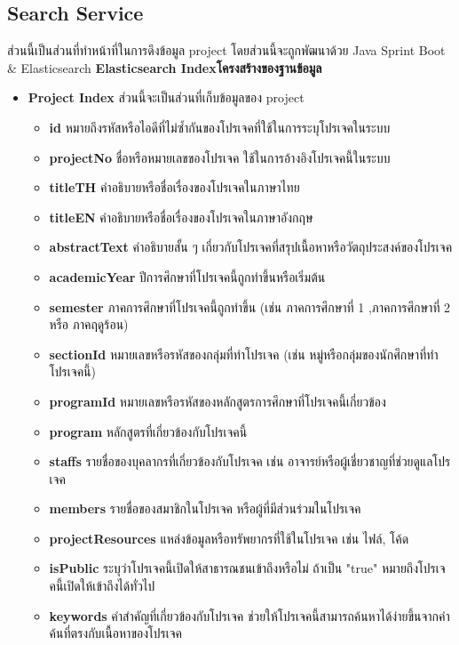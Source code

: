 \subsection{Search Service}
\hspace{1.27cm} \raggedright ส่วนนี้เป็นส่วนที่ทำหน้าที่ในการดึงข้อมูล project โดยส่วนนี้จะถูกพัฒนาด้วย Java Sprint Boot \& Elasticsearch
\textbf{\ifenglish Elasticsearch Index\else โครงสร้างของฐานข้อมูล\fi}
\begin{itemize}
  \item \textbf{Project Index} ส่วนนี้จะเป็นส่วนที่เก็บข้อมูลของ project
  \begin{itemize}
    \item \textbf{id} หมายถึงรหัสหรือไอดีที่ไม่ซ้ำกันของโปรเจคที่ใช้ในการระบุโปรเจคในระบบ
    \item \textbf{projectNo} ชื่อหรือหมายเลขของโปรเจค ใช้ในการอ้างอิงโปรเจคนี้ในระบบ
    \item \textbf{titleTH} คำอธิบายหรือชื่อเรื่องของโปรเจคในภาษาไทย
    \item \textbf{titleEN} คำอธิบายหรือชื่อเรื่องของโปรเจคในภาษาอังกฤษ
    \item \textbf{abstractText} คำอธิบายสั้น ๆ เกี่ยวกับโปรเจคที่สรุปเนื้อหาหรือวัตถุประสงค์ของโปรเจค
    \item \textbf{academicYear} ปีการศึกษาที่โปรเจคนี้ถูกทำขึ้นหรือเริ่มต้น
    \item \textbf{semester} ภาคการศึกษาที่โปรเจคนี้ถูกทำขึ้น (เช่น ภาคการศึกษาที่ 1 ,ภาคการศึกษาที่ 2 หรือ ภาคฤดูร้อน)
    \item \textbf{sectionId} หมายเลขหรือรหัสของกลุ่มที่ทำโปรเจค (เช่น หมู่หรือกลุ่มของนักศึกษาที่ทำโปรเจคนี้)
    \item \textbf{programId} หมายเลขหรือรหัสของหลักสูตรการศึกษาที่โปรเจคนี้เกี่ยวข้อง
    \item \textbf{program} หลักสูตรที่เกี่ยวข้องกับโปรเจคนี้
    \item \textbf{staffs} รายชื่อของบุคลากรที่เกี่ยวข้องกับโปรเจค เช่น อาจารย์หรือผู้เชี่ยวชาญที่ช่วยดูแลโปรเจค
    \item \textbf{members} รายชื่อของสมาชิกในโปรเจค หรือผู้ที่มีส่วนร่วมในโปรเจค
    \item \textbf{projectResources} แหล่งข้อมูลหรือทรัพยากรที่ใช้ในโปรเจค เช่น ไฟล์, โค้ด
    \item \textbf{isPublic} ระบุว่าโปรเจคนี้เปิดให้สาธารณชนเข้าถึงหรือไม่ ถ้าเป็น "true" หมายถึงโปรเจคนี้เปิดให้เข้าถึงได้ทั่วไป
    \item \textbf{keywords} คำสำคัญที่เกี่ยวข้องกับโปรเจค ช่วยให้โปรเจคนี้สามารถค้นหาได้ง่ายขึ้นจากคำค้นที่ตรงกับเนื้อหาของโปรเจค
  \end{itemize}
\end{itemize}
